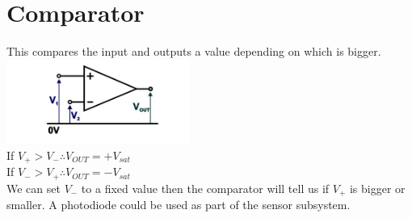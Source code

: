 \documentclass[a4paper,11pt, twocolumn]{article}
\begin{document}
\section{Comparator}
This compares the input and outputs a value depending on which is bigger. \\
\includegraphics[width=0.45\textwidth]{comparator.jpg}\\
If $V_+>V_- \therefore V_{OUT} = +V_{sat}$\\
If $V_->V_+ \therefore V_{OUT} = -V_{sat}$\\
We can set $V_-$ to a fixed value then the comparator will tell us if $V_+$ is bigger or smaller. A photodiode could be used as part of the sensor subsystem. 
\end{document}
